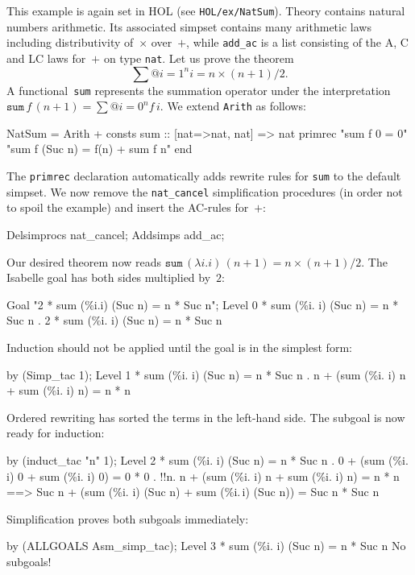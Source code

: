 This example is again set in HOL (see \texttt{HOL/ex/NatSum}).  Theory
 contains natural numbers arithmetic.  Its associated simpset
contains many arithmetic laws including distributivity of~$\times$ over~$+$,
while \texttt{add_ac} is a list consisting of the A, C and LC laws for~$+$ on
type \texttt{nat}.  Let us prove the theorem
\[ \sum@{i=1}^n i = n\times(n+1)/2. \]
%
A functional~\texttt{sum} represents the summation operator under the
interpretation $\texttt{sum} \, f \, (n + 1) = \sum@{i=0}^n f\,i$.  We
extend \texttt{Arith} as follows:
\begin{ttbox}
NatSum = Arith +
consts sum     :: [nat=>nat, nat] => nat
primrec 
  "sum f 0 = 0"
  "sum f (Suc n) = f(n) + sum f n"
end
\end{ttbox}
The \texttt{primrec} declaration automatically adds rewrite rules for
\texttt{sum} to the default simpset.  We now remove the
\texttt{nat_cancel} simplification procedures (in order not to spoil
the example) and insert the AC-rules for~$+$:
\begin{ttbox}
Delsimprocs nat_cancel;
Addsimps add_ac;
\end{ttbox}
Our desired theorem now reads $\texttt{sum} \, (\lambda i.i) \, (n+1) =
n\times(n+1)/2$.  The Isabelle goal has both sides multiplied by~$2$:
\begin{ttbox}
Goal "2 * sum (\%i.i) (Suc n) = n * Suc n";
{\out Level 0}
{ * sum (\%i. i) (Suc n) = n * Suc n}
{. 2 * sum (\%i. i) (Suc n) = n * Suc n}
\end{ttbox}
Induction should not be applied until the goal is in the simplest
form:
\begin{ttbox}
by (Simp_tac 1);
{\out Level 1}
{ * sum (\%i. i) (Suc n) = n * Suc n}
{. n + (sum (\%i. i) n + sum (\%i. i) n) = n * n}
\end{ttbox}
Ordered rewriting has sorted the terms in the left-hand side.  The
subgoal is now ready for induction:
\begin{ttbox}
by (induct_tac "n" 1);
{\out Level 2}
{ * sum (\%i. i) (Suc n) = n * Suc n}
{. 0 + (sum (\%i. i) 0 + sum (\%i. i) 0) = 0 * 0}
\ttbreak
{. !!n. n + (sum (\%i. i) n + sum (\%i. i) n) = n * n}
{\out           ==> Suc n + (sum (\%i. i) (Suc n) + sum (\%i.\,i) (Suc n)) =}
{\out               Suc n * Suc n}
\end{ttbox}
Simplification proves both subgoals immediately:
\begin{ttbox}
by (ALLGOALS Asm_simp_tac);
{\out Level 3}
{ * sum (\%i. i) (Suc n) = n * Suc n}
{\out No subgoals!}
\end{ttbox}
